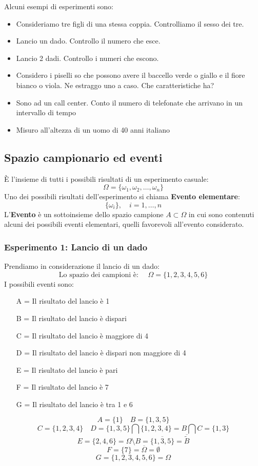 \documentclass[a4paper]{article}
\theoremstyle{break}
\theoremstyle{break}
\theoremstyle{break}
\theoremstyle{break}
\begin{document}
\noindent Alcuni esempi di esperimenti sono:
\begin{itemize}
  \item Consideriamo tre figli di una stessa coppia. Controlliamo il sesso dei tre.
  \item Lancio un dado.
    Controllo il numero che esce. 
  \item Lancio 2 dadi.
    Controllo i numeri che escono. 
  \item Considero i piselli so che possono avere il baccello verde o giallo e il fiore
    bianco o viola.
    Ne estraggo uno a caso. Che caratteristiche ha? 
  \item Sono ad un call center.
    Conto il numero di telefonate
    che arrivano in un intervallo di tempo  
  \item Misuro all’altezza di un uomo
    di 40 anni italiano 
\end{itemize}

\subsection{Spazio campionario ed eventi}
È l'insieme di tutti i possibili risultati di un esperimento casuale:
\[
  \Omega = \{\omega_1, \omega_2, \ldots, \omega_n\}
\] 
Uno dei possibili risultati dell'esperimento si chiama \textbf{Evento elementare}:
\[
  \{\omega_i\},\quad i = 1, \ldots, n 
\] 
L'\textbf{Evento} è un sottoinsieme dello spazio campione \( A \subset \Omega \) in cui
sono contenuti alcuni dei possibili eventi elementari, quelli favorevoli all'evento
considerato.
\subsubsection{Esperimento 1: Lancio di un dado}
Prendiamo in considerazione il lancio di un dado:
\[
\text{Lo spazio dei campioni è: } \quad \Omega = \{1, 2, 3, 4, 5, 6\}
\] 
I possibili eventi sono:
\begin{enumerate}
  \item[A =] Il risultato del lancio è 1
  \item[B =] Il risultato del lancio è dispari
  \item[C =] Il risultato del lancio è maggiore di 4
  \item[D =] Il risultato del lancio è dispari non maggiore di 4
  \item[E =] Il risultato del lancio è pari
  \item[F =] Il risultato del lancio è 7
  \item[G =] Il risultato del lancio è tra 1 e 6
\end{enumerate}
\[
  A = \{1\} \quad B = \{1, 3, 5\} 
\] 
\[
  C = \{1, 2, 3, 4\} \quad D = \{1, 3, 5\} \bigcap \{1, 2, 3, 4\} = B \bigcap C = \{1,3\} 
\] 
\[
  E = \{2, 4, 6\} = \Omega \setminus B = \overline{\{1, 3, 5\} } = \overline{\tilde{B}}
\]
\[
  F = \{7\} = \overline{\Omega} = \emptyset
\] 
\[
  G = \{1, 2, 3, 4, 5, 6\} = \Omega 
\] 
\end{document}
